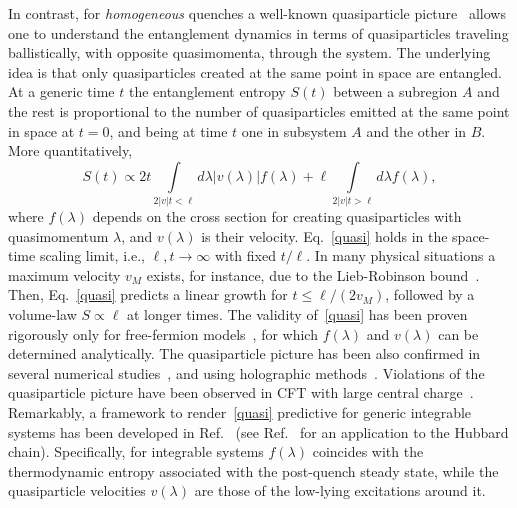 \documentclass[twocolumn,superscriptaddress,prb,10pt]{revtex4-1}
\begin{document}
In contrast, 
for {\it homogeneous} quenches a well-known quasiparticle picture~\cite{calabrese-2005} 
allows one to understand the entanglement dynamics  in terms of quasiparticles 
traveling ballistically, with opposite quasimomenta, through the system. The 
underlying idea is that only quasiparticles created at the same point in space 
are entangled. At a generic time $t$ the entanglement entropy $S(t)$ 
between a subregion $A$ and the rest is proportional to the number of 
quasiparticles emitted at the same point in space at $t=0$, and being  
at time $t$ one in subsystem $A$ and the other in $B$. More quantitatively, 
%
\begin{equation}
\label{quasi}
S(t)\propto 2t\!\!\!\!\int\limits_{\!2|v|t<\ell}\!\!\!\!d\lambda |v(\lambda)|f(\lambda)+
\ell\!\!\!\!\int\limits_{2|v|t>\ell}\!\!\!\!d\lambda f(\lambda), 
\end{equation}
%
where $f(\lambda)$ depends on the cross section for creating quasiparticles  with 
quasimomentum $\lambda$, and $v(\lambda)$ is their velocity. 
Eq.~\eqref{quasi} holds in the space-time scaling limit, i.e., $\ell,t\to\infty$ with 
fixed $t/\ell$. In many physical situations a maximum velocity $v_M$ exists, for instance, 
due to the Lieb-Robinson bound~\cite{lieb-1972}. Then, Eq.~\eqref{quasi} predicts 
a linear growth for $t\le \ell/(2v_M)$, followed by a volume-law $S\propto\ell$ at 
longer times. The validity of~\eqref{quasi} has been proven rigorously only for 
free-fermion models~\cite{fagotti-2008,ep-08,nr-14,coser-2014,cotler-2016,buyskikh-2016}, 
for which $f(\lambda)$ and $v(\lambda)$ can be determined analytically. The quasiparticle 
picture has been also confirmed in several numerical studies~\cite{de-chiara-2006,lauchli-2008,
kim-2013}, and using holographic methods~\cite{hrt-07,aal-10,aj-10,allais-2012,
callan-2012,ls-14,bala-2011,liu-2014}. Violations of the quasiparticle picture have 
been observed in CFT with large central charge~\cite{bala-2011,ab-13,asplund-2015,lm-15,kundu-2017,sagar-2017}. 
Remarkably, a framework to render~\eqref{quasi} predictive for generic integrable systems 
has been developed in Ref.~ (see Ref.~ for an application to 
the Hubbard chain). Specifically, for integrable systems $f(\lambda)$ coincides with 
the thermodynamic entropy associated with the post-quench steady state, while the 
quasiparticle velocities $v(\lambda)$ are those of the low-lying excitations 
around it.  
\end{document}
